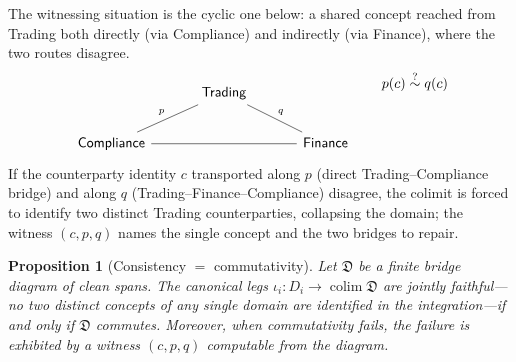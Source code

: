\documentclass[11pt]{article}
\theoremstyle{plain}
\newtheorem{proposition}{Proposition}
\theoremstyle{definition}
\begin{document}
The witnessing situation is the cyclic one below: a shared concept reached from Trading both directly (via Compliance) and indirectly (via Finance), where the two routes disagree.
\[
\begin{tikzcd}[column sep=3.2em, row sep=2.0em]
& \mathsf{Trading} \arrow[dl, "p"', dash] \arrow[dr, "q", dash] & \\
\mathsf{Compliance} \arrow[rr, dash] & & \mathsf{Finance}
\end{tikzcd}
\qquad
\raisebox{2.2em}{$\displaystyle p(c)\overset{?}{\sim}q(c)$}
\]
If the counterparty identity $c$ transported along $p$ (direct Trading--Compliance bridge) and along $q$ (Trading--Finance--Compliance) disagree, the colimit is forced to identify two distinct Trading counterparties, collapsing the domain; the witness $(c,p,q)$ names the single concept and the two bridges to repair.

\begin{proposition}[Consistency $=$ commutativity]\label{prop:commute}
Let $\mathfrak{D}$ be a finite bridge diagram of clean spans. The canonical legs $\iota_i\colon D_i \to \operatorname{colim}\mathfrak{D}$ are jointly faithful---no two distinct concepts of any single domain are identified in the integration---if and only if $\mathfrak{D}$ commutes. Moreover, when commutativity fails, the failure is exhibited by a witness $(c,p,q)$ computable from the diagram.
\end{proposition}
\end{document}
